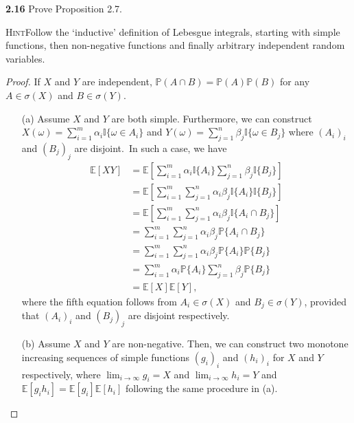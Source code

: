\noindent\textbf{2.16} Prove Proposition 2.7.

\noindent\textsc{Hint}\quad Follow the `inductive' definition of Lebesgue integrals, starting with simple functions, then non-negative functions and finally arbitrary independent random variables.

\begin{proof}
    If $X$ and $Y$ are independent, $\mathbb{P}(A \cap B) = \mathbb{P}(A) \mathbb{P}(B)$ for any $A \in \sigma(X)$ and $B \in \sigma(Y)$.
    \begin{enumerate}
        \item[(a)] Assume $X$ and $Y$ are both simple.
        Furthermore, we can construct $X(\omega) = \sum_{i=1}^m \alpha_i \mathbb{I}\{\omega \in A_i\}$ and $Y(\omega) = \sum_{j=1}^n \beta_j \mathbb{I}\{\omega \in B_j\}$ where $(A_i)_i$ and $(B_j)_j$ are disjoint.\
        In such a case, we have
        \begin{equation*}
            \begin{aligned}
                \mathbb{E}[XY]
                &= \mathbb{E}[\sum_{i=1}^m \alpha_i \mathbb{I}\{A_i\} \sum_{j=1}^n \beta_j \mathbb{I}\{B_j\}]\\
                &= \mathbb{E}[\sum_{i=1}^m \sum_{j=1}^n \alpha_i \beta_j \mathbb{I}\{A_i\} \mathbb{I}\{B_j\}]\\
                &= \mathbb{E}[\sum_{i=1}^m \sum_{j=1}^n \alpha_i \beta_j \mathbb{I}\{A_i \cap B_j\}]\\
                &= \sum_{i=1}^m \sum_{j=1}^n \alpha_i \beta_j \mathbb{P}\{A_i \cap B_j\}\\
                &= \sum_{i=1}^m \sum_{j=1}^n \alpha_i \beta_j \mathbb{P}\{A_i\} \mathbb{P}\{B_j\}\\
                &= \sum_{i=1}^m \alpha_i \mathbb{P}\{A_i\} \sum_{j=1}^n \beta_j \mathbb{P}\{B_j\}\\
                &= \mathbb{E}[X] \mathbb{E}[Y],
            \end{aligned}
        \end{equation*}
        where the fifth equation follows from $A_i \in \sigma(X)$ and $B_j \in \sigma(Y)$, provided that $(A_i)_i$ and $(B_j)_j$ are disjoint respectively.
        \item[(b)] Assume $X$ and $Y$ are non-negative.
        Then, we can construct two monotone increasing sequences of simple functions $(g_i)_i$ and $(h_i)_i$ for $X$ and $Y$ respectively, where $\lim_{i \rightarrow \infty} g_i = X$ and $\lim_{i \rightarrow \infty} h_i = Y$ and $\mathbb{E}[g_i h_i] = \mathbb{E}[g_i] \mathbb{E}[h_i]$ following the same procedure in (a).

\end{enumerate}
\end{proof}
